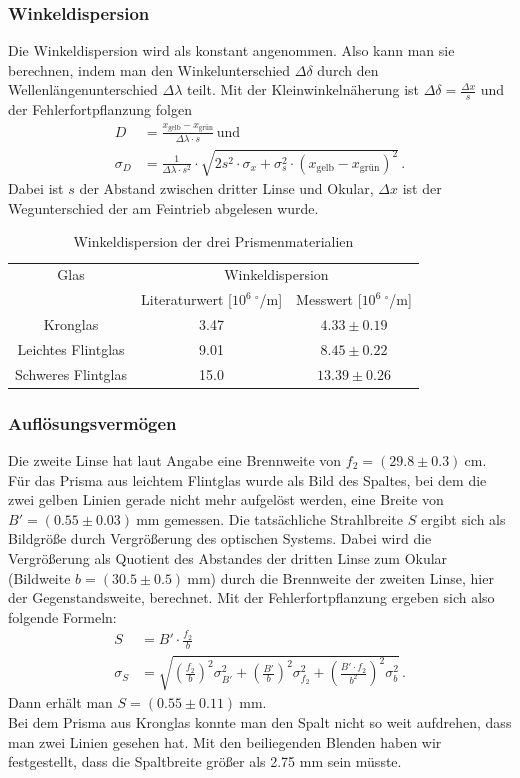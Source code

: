 \documentclass[12pt,a4paper,titlepage,headinclude,bibtotoc]{scrartcl}
\begin{document}
\subsubsection{Winkeldispersion}
Die Winkeldispersion wird als konstant angenommen.
Also kann man sie berechnen, indem man den Winkelunterschied $\Delta\delta$ durch den Wellenlängenunterschied $\Delta\lambda$ teilt.
Mit der Kleinwinkelnäherung ist $\Delta\delta=\frac{\Delta x}{s}$ und der Fehlerfortpflanzung folgen
\begin{align}
	D&=\frac{x_\text{gelb} - x_\text{grün}}{\Delta\lambda \cdot s}\,\text{und}\\
\sigma_{D}&=\frac{1}{\Delta\lambda \cdot s^{2}} \cdot \sqrt{2s^{2} \cdot \sigma_{x} + \sigma_{s}^{2} \cdot \left(x_\text{gelb} - x_\text{grün}\right)^{2}}\,.
\end{align}
Dabei ist $s$ der Abstand zwischen dritter Linse und Okular, $\Delta x$ ist der Wegunterschied der am Feintrieb abgelesen wurde.
\begin{table}[!htb]
	\centering
	\begin{tabular}{|c|c|c|}
		\hline
		Glas & \multicolumn{2}{c|}{Winkeldispersion}\\		
		 & Literaturwert [$10^6~^\circ$/m] & Messwert [$10^6~^\circ$/m]\\
		\hline
		Kronglas& 3.47 & $4.33 \pm 0.19$ \\
		Leichtes Flintglas & 9.01 & $8.45 \pm 0.22$ \\
		Schweres Flintglas & 15.0 & $13.39 \pm 0.26$ \\
		\hline
	\end{tabular}
	\caption{Winkeldispersion der drei Prismenmaterialien}
	\label{tab:Dispersion}
\end{table}

\subsubsection{Auflösungsvermögen}
Die zweite Linse hat laut Angabe eine Brennweite von $f_2=(29.8 \pm 0.3)~$cm.
Für das Prisma aus leichtem Flintglas wurde als Bild des Spaltes, bei dem die zwei gelben Linien gerade nicht mehr aufgelöst werden, eine Breite von $B'=(0.55 \pm 0.03)~$mm gemessen.
Die tatsächliche Strahlbreite $S$ ergibt sich als Bildgröße durch Vergrößerung des optischen Systems.
Dabei wird die Vergrößerung als Quotient des Abstandes der dritten Linse zum Okular (Bildweite $b=(30.5\pm 0.5)~$mm) durch die Brennweite der zweiten Linse, hier der Gegenstandsweite, berechnet.
Mit der Fehlerfortpflanzung ergeben sich also folgende Formeln:
\begin{align}
	S&=B'\cdot\frac{f_2}{b}\\
	\sigma_S&=\sqrt{\left(\frac{f_2}{b}\right)^2\sigma_{B'}^2+\left(\frac{B'}{b}\right)^2\sigma_{f_2}^2+\left(\frac{B' \cdot f_2}{b^2}\right)^2\sigma_b^2}\,.
\end{align}
Dann erhält man $S=(0.55\pm 0.11)~$mm.\\
Bei dem Prisma aus Kronglas konnte man den Spalt nicht so weit aufdrehen, dass man zwei Linien gesehen hat.
Mit den beiliegenden Blenden haben wir festgestellt, dass die Spaltbreite größer als 2.75 mm sein müsste.
\end{document}
